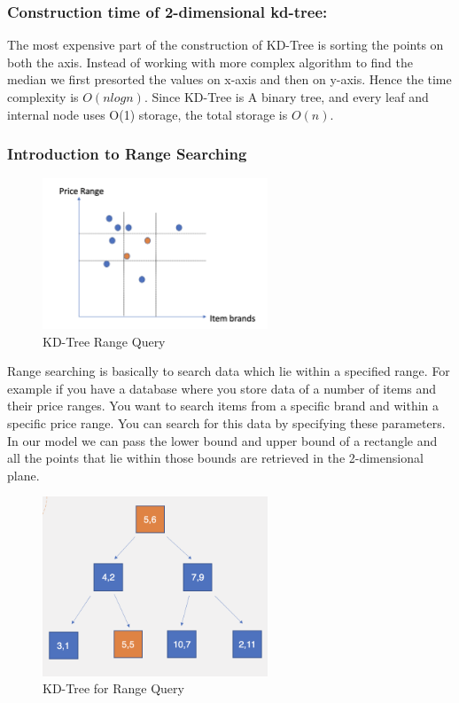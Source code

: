 \subsubsection{Construction time of 2-dimensional kd-tree:}

The most expensive part of the construction of KD-Tree is sorting the points on both the axis. Instead of working with more complex algorithm to find the median we first presorted the values on x-axis and then on y-axis. Hence the time complexity is $O( n log n)$. Since KD-Tree is A binary tree, and every leaf and internal node uses O(1) storage, the total storage is $O(n)$.


\subsubsection{Introduction to Range Searching}

\begin{figure}[htp]
    \centering
    \includegraphics[width=0.6\textwidth]{graphs/Range_Query_Intro.png}
    \caption{KD-Tree Range Query}
    \label{fig:KD_ee_Range_Query_Intro}
\end{figure}

Range searching is basically to search data which lie within a specified range. For example if you have a database where you store data of a number of items and their price ranges. You want to search items from a specific brand and within a specific price range. You can search for this data by specifying these parameters. In our model we can pass the lower bound and upper bound of a rectangle and all the points that lie within those bounds are retrieved in the 2-dimensional plane.


\begin{figure}[htp]
    \centering
    \includegraphics[width=0.6\textwidth]{graphs/Range_Query_Tree.png}
    \caption{KD-Tree for Range Query}
    \label{fig:KD-Tree_for_Range Query}
\end{figure}

